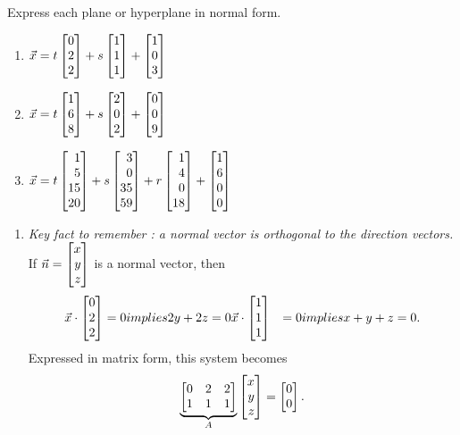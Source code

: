 \begin{exercises}
\begin{problist}
		\prob Express each plane or hyperplane in normal form.
			\begin{enumerate}
				\item $\vec x = t\mat{0\\2\\2}+s\mat{1\\1\\1}+\mat{1\\0\\3}$
				\item $\vec x = t\mat{1\\6\\8}+s\mat{2\\0\\2}+\mat{0\\0\\9}$
				\item $\vec x = t\mat{1\\5\\15\\20}+s\mat{3\\0\\35\\59}+
				r\mat{1\\4\\0\\18}+\mat{1\\6\\0\\0}$
			\end{enumerate}
		\begin{solution}
			\begin{enumerate}
				\item \emph {Key fact to remember : a normal vector is orthogonal to the direction vectors.} 
					If $\vec{n} = \mat{x\\y\\z}$ is a normal vector, then
					\begin{align*}
						\vec x \cdot \mat{0\\2\\2} &= 0  implies 2y+2z = 0
						\vec x \cdot \mat{1\\1\\1} &= 0 implies x+y+z = 0.
					\end{align*}
					Expressed in matrix form, this system becomes 
					\begin{align*}
						\underbrace{\mat{0&2&2\\1&1&1}}_{A} \mat{x\\y\\z} = \mat{0\\0}.

\end{align*}
\end{enumerate}
\end{solution}
\end{problist}
\end{exercises}

